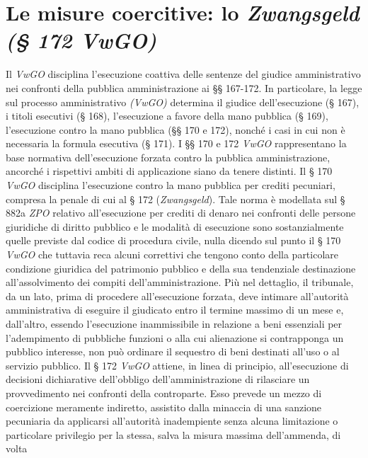 \documentclass[12pt,it,a4paper,]{report}
\begin{document}
\hypertarget{le-misure-coercitive-lo-zwangsgeld-172-vwgo}{%
\section{\texorpdfstring{Le misure coercitive: lo \emph{Zwangsgeld (§
172
VwGO)}}{Le misure coercitive: lo Zwangsgeld (§ 172 VwGO)}}\label{le-misure-coercitive-lo-zwangsgeld-172-vwgo}}

Il \emph{VwGO} disciplina l'esecuzione coattiva delle sentenze del
giudice amministrativo nei confronti della pubblica amministrazione ai
§§ 167-172. In particolare, la legge sul processo amministrativo
\emph{(VwGO)} determina il giudice dell'esecuzione (§ 167), i titoli
esecutivi (§ 168), l'esecuzione a favore della mano pubblica (§ 169),
l'esecuzione contro la mano pubblica (§§ 170 e 172), nonché i casi in
cui non è necessaria la formula esecutiva (§ 171). I §§ 170 e 172
\emph{VwGO} rappresentano la base normativa dell'esecuzione forzata
contro la pubblica amministrazione, ancorché i rispettivi ambiti di
applicazione siano da tenere distinti. Il § 170 \emph{VwGO} disciplina
l'esecuzione contro la mano pubblica per crediti pecuniari, compresa la
penale di cui al § 172 (\emph{Zwangsgeld}). Tale norma è modellata sul §
882a \emph{ZPO} relativo all'esecuzione per crediti di denaro nei
confronti delle persone giuridiche di diritto pubblico e le modalità di
esecuzione sono sostanzialmente quelle previste dal codice di procedura
civile, nulla dicendo sul punto il § 170 \emph{VwGO} che tuttavia reca
alcuni correttivi che tengono conto della particolare condizione
giuridica del patrimonio pubblico e della sua tendenziale destinazione
all'assolvimento dei compiti dell'amministrazione. Più nel dettaglio, il
tribunale, da un lato, prima di procedere all'esecuzione forzata, deve
intimare all'autorità amministrativa di eseguire il giudicato entro il
termine massimo di un mese e, dall'altro, essendo l'esecuzione
inammissibile in relazione a beni essenziali per l'adempimento di
pubbliche funzioni o alla cui alienazione si contrapponga un pubblico
interesse, non può ordinare il sequestro di beni destinati all'uso o al
servizio pubblico. Il § 172 \emph{VwGO} attiene, in linea di principio,
all'esecuzione di decisioni dichiarative dell'obbligo
dell'amministrazione di rilasciare un provvedimento nei confronti della
controparte. Esso prevede un mezzo di coercizione meramente indiretto,
assistito dalla minaccia di una sanzione pecuniaria da applicarsi
all'autorità inadempiente senza alcuna limitazione o particolare
privilegio per la stessa, salva la misura massima dell'ammenda, di volta
\end{document}
